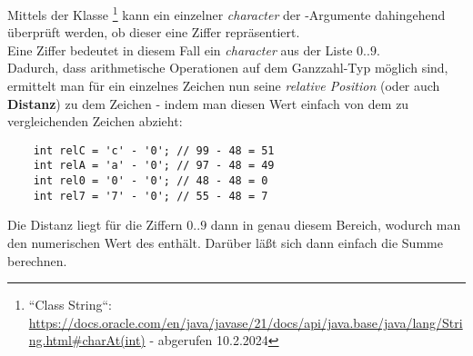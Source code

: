 \noindent
Mittels  der Klasse \footnote{
    ``Class String``: \url{https://docs.oracle.com/en/java/javase/21/docs/api/java.base/java/lang/String.html#charAt(int)} - abgerufen 10.2.2024
} kann ein einzelner \textit{character} der -Argumente dahingehend überprüft werden, ob dieser eine Ziffer repräsentiert.\\
Eine Ziffer bedeutet in diesem Fall ein \textit{character} aus der Liste $0..9$.\\
Dadurch, dass arithmetische Operationen auf dem Ganzzahl-Typ  möglich sind, ermittelt man für ein einzelnes Zeichen nun seine \textit{relative Position} (oder auch \textbf{Distanz}) zu dem Zeichen  - indem man diesen Wert einfach von dem zu vergleichenden Zeichen abzieht:

\begin{verbatim}
    int relC = 'c' - '0'; // 99 - 48 = 51
    int relA = 'a' - '0'; // 97 - 48 = 49
    int rel0 = '0' - '0'; // 48 - 48 = 0
    int rel7 = '7' - '0'; // 55 - 48 = 7
\end{verbatim}

Die Distanz liegt für die Ziffern $0..9$ dann in genau diesem Bereich, wodurch man den numerischen Wert des  enthält.
Darüber läßt sich dann einfach die Summe berechnen.